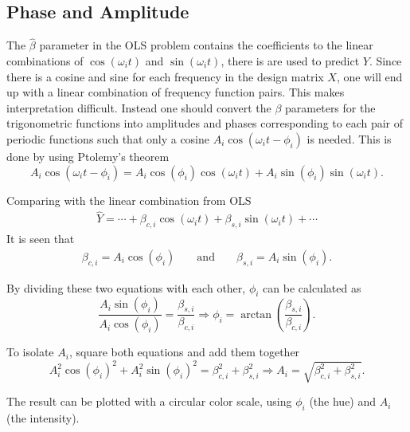 \subsection{Phase and Amplitude}

The $\hat{\beta}$ parameter in the OLS problem contains the coefficients to the linear combinations of $\cos(\omega_i t)$ and $\sin(\omega_i t)$, there is are used to predict $Y$.
Since there is a cosine and sine for each frequency in the design matrix $X$, one will end up with a linear combination of frequency function pairs. This makes interpretation difficult.
Instead one should convert the $\beta$ parameters for the trigonometric functions into amplitudes and phases corresponding to each pair of periodic functions such that only a cosine  $A_i \cos(\omega_i t - \phi_i)$ is needed.
This is done by using Ptolemy's theorem
\begin{equation}
A_i \cos(\omega_i t - \phi_i) = A_i \cos(\phi_i) \cos(\omega_i t) + A_i \sin(\phi_i) \sin(\omega_i t).
\end{equation}

Comparing with the linear combination from OLS
\begin{align}
\hat{Y} = \cdots + \beta_{c,i} \cos(\omega_i t) + \beta_{s,i} \sin(\omega_i t) + \cdots
\end{align}
It is seen that
\begin{align}
\beta_{c,i} = A_i \cos(\phi_i) && \text{ and } && \beta_{s,i} = A_i \sin(\phi_i).
\end{align}

By dividing these two equations with each other, $\phi_i$ can be calculated as 
\begin{equation}
\frac{A_i \sin(\phi_i)}{A_i \cos(\phi_i)} = \frac{\beta_{s,i}}{\beta_{c,i}} \Rightarrow \phi_i = \arctan\left(\frac{\beta_{s,i}}{\beta_{c,i}}\right).
\end{equation}

To isolate $A_i$, square both equations and add them together
\begin{equation}
A_i^2 \cos(\phi_i)^2 + A_i^2 \sin(\phi_i)^2 = \beta_{c,i}^2 + \beta_{s,i}^2 \Rightarrow A_i = \sqrt{\beta_{c,i}^2 + \beta_{s,i}^2}.
\end{equation}

The result can be plotted with a circular color scale, using $\phi_i$ (the hue) and $A_i$ (the intensity).
